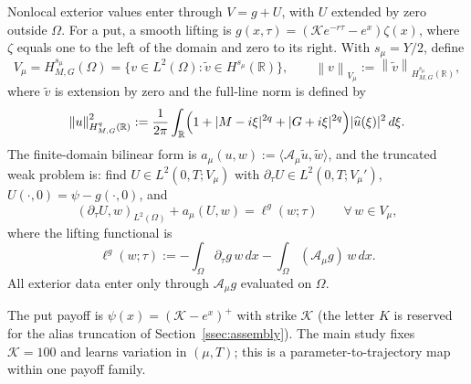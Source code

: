 \documentclass[11pt]{amsart}
\theoremstyle{remark}
\newcommand{\R}{\mathbb{R}}
\newcommand{\Vmu}{V_{\mu}}
\newcommand{\norm}[1]{\left\lVert #1\right\rVert}
\newcommand{\Hs}{H^{s_\mu}_{M,G}}
\newcommand{\Aop}{\mathcal A_\mu}
\begin{document}
Nonlocal exterior values enter through $V=g+U$, with $U$ extended by zero
outside $\Omega$. For a put, a smooth lifting is
$g(x,\tau)=(\mathcal Ke^{-r\tau}-e^x)\zeta(x)$, where $\zeta$ equals one to the left
of the domain and zero to its right. With $s_\mu=Y/2$, define
\begin{equation}
  \Vmu=\Hs(\Omega)
  =\bigl\{v\in L^2(\Omega):\widetilde v\in H^{s_\mu}(\R)\bigr\},
  \qquad
  \norm{v}_{\Vmu}:=\norm{\widetilde v}_{H^{s_\mu}_{M,G}(\R)},
  \label{eq:energy-space}
\end{equation}
where $\widetilde v$ is extension by zero and the full-line norm is defined by
\begin{equation}
  \norm{u}_{H^{q}_{M,G}(\R)}^2
  :=\frac1{2\pi}\int_\R
  \Bigl(1+|M-i\xi|^{2q}+|G+i\xi|^{2q}\Bigr)|\widehat u(\xi)|^2\,d\xi .
  \label{eq:HMG-norm}
\end{equation}
The finite-domain bilinear form is
$a_\mu(u,w):=\langle\Aop\widetilde u,\widetilde w\rangle$, and the truncated
weak problem is: find $U\in L^2(0,T;\Vmu)$ with
$\partial_\tau U\in L^2(0,T;\Vmu')$, $U(\cdot,0)=\psi-g(\cdot,0)$, and
\begin{equation}
  (\partial_\tau U,w)_{L^2(\Omega)}+a_\mu(U,w)=\ell^g(w;\tau)
  \qquad\forall\,w\in\Vmu,
  \label{eq:weak-problem}
\end{equation}
where the lifting functional is
\begin{equation}
  \ell^{g}(w;\tau)
  :=-\int_\Omega\partial_\tau g\,w\,dx-\int_\Omega(\Aop g)\,w\,dx .
  \label{eq:lifting-functional}
\end{equation}
All exterior data enter only through $\Aop g$ evaluated on $\Omega$.


The put payoff is $\psi(x)=(\mathcal K-e^x)^+$ with strike $\mathcal K$ (the letter $K$ is reserved
for the alias truncation of Section~\ref{ssec:assembly}). The main study fixes $\mathcal K=100$ and
learns variation in $(\mu,T)$; this is a parameter-to-trajectory map within
one payoff family.
\end{document}
